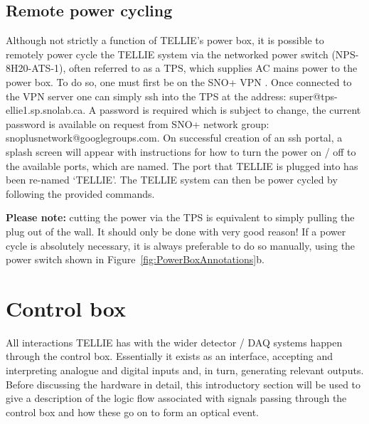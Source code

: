 \documentclass[12pt]{report}
\begin{document}
\section{Remote power cycling}
Although not strictly a function of TELLIE's power box, it is possible to remotely power cycle the TELLIE system via the networked power switch (NPS-8H20-ATS-1), often referred to as a TPS, which supplies AC mains power to the power box. To do so, one must first be on the SNO+ VPN \cite{NetworkManual}. Once connected to the VPN server one can simply ssh into the TPS at the address: super@tps-ellie1.sp.snolab.ca. A password is required which is subject to change, the current password is available on request from SNO+ network group: snoplusnetwork@googlegroups.com. On successful creation of an ssh portal, a splash screen will appear with instructions for how to turn the power on / off to the available ports, which are named. The port that TELLIE is plugged into has been re-named `TELLIE'. The TELLIE system can then be power cycled by following the provided commands.

\textbf{Please note:} cutting the power via the TPS is equivalent to simply pulling the plug out of the wall. It should only be done with very good reason! If a power cycle is absolutely necessary, it is always preferable to do so manually, using the power switch shown in Figure~\ref{fig:PowerBoxAnnotations}b. 

\chapter{Control box}
\label{chap:ControlBox}
All interactions TELLIE has with the wider detector / DAQ systems happen through the control box. Essentially it exists as an interface, accepting and interpreting analogue and digital inputs and, in turn, generating relevant outputs. Before discussing the hardware in detail, this introductory section will be used  to give a description of the logic flow associated with signals passing through the control box and how these go on to form an optical event. 
\end{document}
